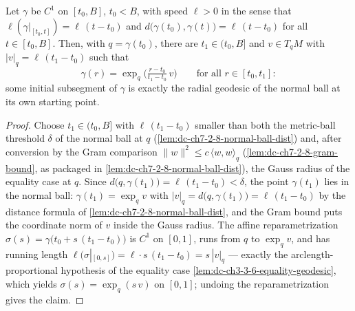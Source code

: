 \begin{lemma}
  \label{lem:dc-ch3-3-9-anchored}
  \leanok
  Let $\gamma$ be $C^1$ on $[t_0,B]$, $t_0<B$, with speed $\ell>0$ in the
  sense that $\ell(\gamma|_{[t_0,t]})=\ell\,(t-t_0)$ and
  $d\big(\gamma(t_0),\gamma(t)\big)=\ell\,(t-t_0)$ for all $t\in[t_0,B]$.
  Then, with $q=\gamma(t_0)$, there are $t_1\in(t_0,B]$ and $v\in T_qM$ with
  $|v|_q=\ell\,(t_1-t_0)$ such that
  $$\gamma(r)=\exp_q\Big(\tfrac{r-t_0}{t_1-t_0}\,v\Big)
    \qquad\text{for all } r\in[t_0,t_1]:$$
  some initial subsegment of $\gamma$ is exactly the radial geodesic of the
  normal ball at its own starting point.
\end{lemma}
\begin{proof}
  \sketch
  \leanok
  Choose $t_1\in(t_0,B]$ with $\ell\,(t_1-t_0)$ smaller than both the
  metric-ball threshold $\delta$ of the normal ball at $q$
  (\cref{lem:dc-ch7-2-8-normal-ball-dist}) and, after conversion by the Gram
  comparison $\|w\|^2\le c\,\langle w,w\rangle_q$
  (\cref{lem:dc-ch7-2-8-gram-bound}, as packaged in
  \cref{lem:dc-ch7-2-8-normal-ball-dist}), the Gauss radius of the equality
  case at $q$. Since $d\big(q,\gamma(t_1)\big)=\ell\,(t_1-t_0)<\delta$, the point
  $\gamma(t_1)$ lies in the normal ball: $\gamma(t_1)=\exp_q v$ with
  $|v|_q=d\big(q,\gamma(t_1)\big)=\ell\,(t_1-t_0)$ by the distance formula
  of \cref{lem:dc-ch7-2-8-normal-ball-dist}, and the Gram bound puts the
  coordinate norm of $v$ inside the Gauss radius. The affine
  reparametrization $\sigma(s)=\gamma\big(t_0+s\,(t_1-t_0)\big)$ is $C^1$ on
  $[0,1]$, runs from $q$ to $\exp_q v$, and has running length
  $\ell(\sigma|_{[0,s]})=\ell\cdot s\,(t_1-t_0)=s\,|v|_q$ — exactly the
  arclength-proportional hypothesis of the equality case
  \cref{lem:dc-ch3-3-6-equality-geodesic}, which yields
  $\sigma(s)=\exp_q(s\,v)$ on $[0,1]$; undoing the reparametrization gives
  the claim.
\end{proof}

